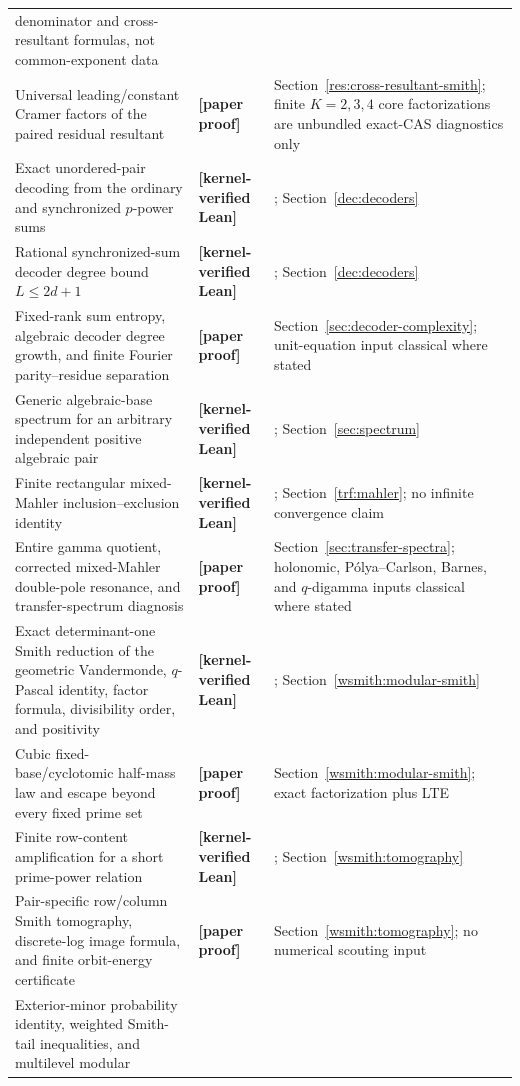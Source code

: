\documentclass[11pt,oneside]{article}
\theoremstyle{definition}
\theoremstyle{remark}
\newcommand{\lean}[1]{\texttt{\detokenize{#1}}}
\newcommand{\statuslean}{\textcolor{leanblue}{\textbf{[kernel-verified Lean]}}}
\newcommand{\statusnew}{\textcolor{newgreen}{\textbf{[paper proof]}}}
\begin{document}
{\begin{longtable}{>{\raggedright\arraybackslash}p{}
                  >{\raggedright\arraybackslash}p{}
                  >{\raggedright\arraybackslash}p{}}
denominator and cross-resultant formulas, not common-exponent data \\
Universal leading/constant Cramer factors of the paired residual resultant & \statusnew &
Section~\ref{res:cross-resultant-smith}; finite $K=2,3,4$ core factorizations are unbundled
exact-CAS diagnostics only \\
Exact unordered-pair decoding from the ordinary and synchronized $p$-power sums & \statuslean &
\lean{SynchronizedSumDecoder}; Section~\ref{dec:decoders} \\
Rational synchronized-sum decoder degree bound $L\le2d+1$ & \statuslean &
\lean{RationalSumDecoder}; Section~\ref{dec:decoders} \\
Fixed-rank sum entropy, algebraic decoder degree growth, and finite Fourier parity--residue
separation & \statusnew & Section~\ref{sec:decoder-complexity}; unit-equation input classical where
stated \\
Generic algebraic-base spectrum for an arbitrary independent positive algebraic pair &
\statuslean & \lean{AlgebraicBaseSpectrum}; Section~\ref{sec:spectrum} \\
Finite rectangular mixed-Mahler inclusion--exclusion identity & \statuslean &
\lean{MixedMahlerFinite}; Section~\ref{trf:mahler}; no infinite convergence claim \\
Entire gamma quotient, corrected mixed-Mahler double-pole resonance, and transfer-spectrum
diagnosis & \statusnew & Section~\ref{sec:transfer-spectra}; holonomic, P\'olya--Carlson, Barnes, and
$q$-digamma inputs classical where stated \\
Exact determinant-one Smith reduction of the geometric Vandermonde, $q$-Pascal identity,
factor formula, divisibility order, and positivity & \statuslean &
\lean{GeometricVandermondeSmith}; Section~\ref{wsmith:modular-smith} \\
Cubic fixed-base/cyclotomic half-mass law and escape beyond every fixed prime set &
\statusnew & Section~\ref{wsmith:modular-smith}; exact factorization plus LTE \\
Finite row-content amplification for a short prime-power relation & \statuslean &
\lean{FinitePlaceShortRelationCore}; Section~\ref{wsmith:tomography} \\
Pair-specific row/column Smith tomography, discrete-log image formula, and finite
orbit-energy certificate & \statusnew & Section~\ref{wsmith:tomography}; no numerical
scouting input \\
Exterior-minor probability identity, weighted Smith-tail inequalities, and multilevel modular

\end{longtable}}
\end{document}

